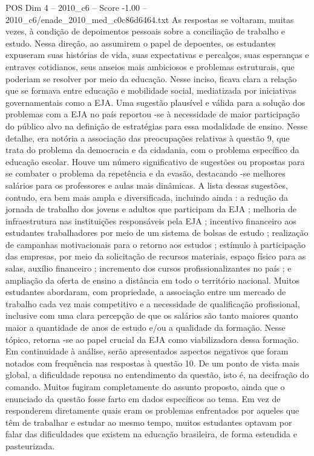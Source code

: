 \begin{textsample}{POS Dim 4 – 2010\_c6 – Score -1.00 – 2010\_c6/enade\_2010\_med\_c0c86d6464.txt}
As respostas se voltaram, muitas vezes, à condição de depoimentos pessoais sobre a conciliação de trabalho e estudo.
Nessa direção, ao assumirem o papel de depoentes, os estudantes expuseram suas histórias de vida, suas expectativas e percalços, suas esperanças e entraves cotidianos, seus anseios mais ambiciosos e problemas estruturais, que poderiam se resolver por meio da educação.
Nesse inciso, ficava clara a relação que se formava entre educação e mobilidade social, mediatizada por iniciativas governamentais como a EJA.
Uma sugestão plausível e válida para a solução dos problemas com a EJA no país reportou -se à necessidade de maior participação do público alvo na definição de estratégias para essa modalidade de ensino.
Nesse detalhe, era notória a associação das preocupações relativas à questão 9, que trata do problema da democracia e da cidadania, com o problema específico da educação escolar.
Houve um número significativo de sugestões ou propostas para se combater o problema da repetência e da evasão, destacando -se melhores salários para os professores e aulas mais dinâmicas.
A lista dessas sugestões, contudo, era bem mais ampla e diversificada, incluindo ainda : a redução da jornada de trabalho dos jovens e adultos que participam da EJA ; melhoria de infraestrutura nas instituições responsáveis pela EJA ; incentivo financeiro aos estudantes trabalhadores por meio de um sistema de bolsas de estudo ; realização de campanhas motivacionais para o retorno aos estudos ; estímulo à participação das empresas, por meio da solicitação de recursos materiais, espaço físico para as salas, auxílio financeiro ; incremento dos cursos profissionalizantes no país ; e ampliação da oferta de ensino a distância em todo o território nacional.
Muitos estudantes abordaram, com propriedade, a associação entre um mercado de trabalho cada vez mais competitivo e a necessidade de qualificação profissional, inclusive com uma clara percepção de que os salários são tanto maiores quanto maior a quantidade de anos de estudo e/ou a qualidade da formação.
Nesse tópico, retorna -se ao papel crucial da EJA como viabilizadora dessa formação.
Em continuidade à análise, serão apresentados aspectos negativos que foram notados com frequência nas respostas à questão 10.
De um ponto de vista mais global, a dificuldade repousa no entendimento da questão, isto é, na decifração do comando.
Muitos fugiram completamente do assunto proposto, ainda que o enunciado da questão fosse farto em dados específicos ao tema.
Em vez de responderem diretamente quais eram os problemas enfrentados por aqueles que têm de trabalhar e estudar ao mesmo tempo, muitos estudantes optavam por falar das dificuldades que existem na educação brasileira, de forma estendida e pasteurizada.

\end{textsample}
